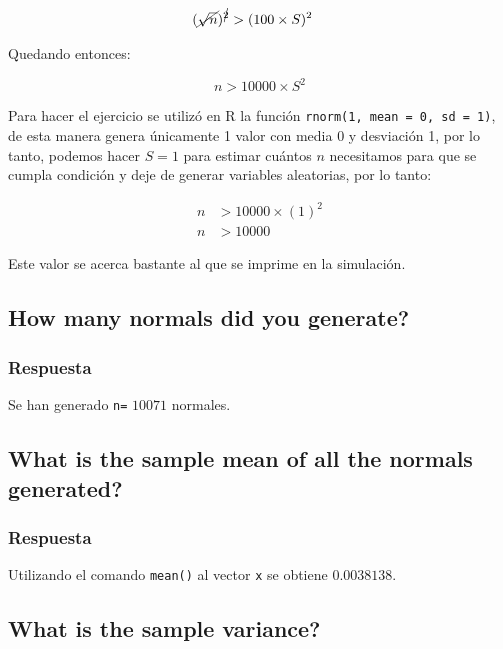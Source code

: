 \documentclass[12pt]{article}\usepackage[]{graphicx}\usepackage[]{xcolor}
\begin{document}
\begin{align*}
  (\cancel{\sqrt{n}})^{\cancel{2}} &> (100 \times S)^{2} 
\end{align*}

Quedando entonces:

\[
n > 10000\times S^{2}
\]

Para hacer el ejercicio se utilizó en \textsf{R} la función \texttt{rnorm(1, mean = 0, sd = 1)}, de esta manera genera únicamente 1 valor con media 0 y desviación 1, por lo tanto, podemos hacer $S = 1$ para estimar cuántos $n$ necesitamos para que se cumpla condición y deje de generar variables aleatorias, por lo tanto:

\begin{align*}
  n &> 10000 \times (1)^{2} \\
  n &> 10000 
\end{align*}

Este valor se acerca bastante al que se imprime en la simulación. 











\subsection{How many normals did you generate?}
\label{subsec:p1-b}

\subsubsection{Respuesta}

Se han generado \lstinline|n=| $10071$ normales.


\subsection{What is the sample mean of all the normals generated?}
\label{subsec:p1-c}




\subsubsection{Respuesta}

Utilizando el comando \lstinline|mean()| al vector \lstinline|x| se obtiene $0.0038138$. 

\subsection{What is the sample variance?}
\label{subsec:p1-d}
\end{document}
